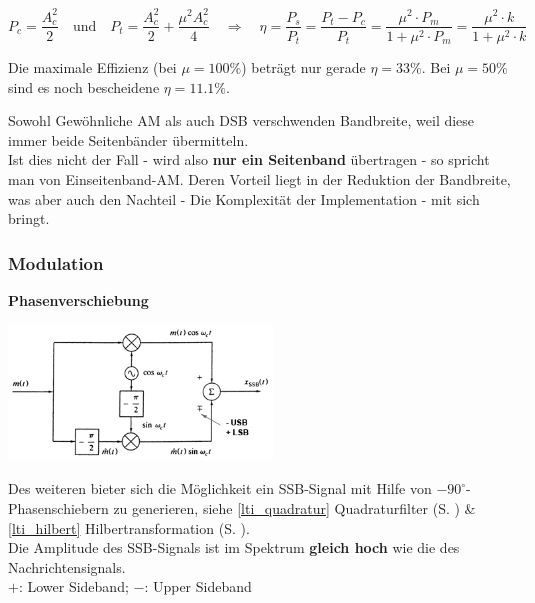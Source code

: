 $$ P_c = \frac{A_c^2}{2} \quad \text{und} \quad P_t = \frac{A_c^2}{2} + \frac{\mu^2 A_c^2}{4}
\quad \Longrightarrow \quad \eta = \frac{P_s}{P_t} = \frac{P_t - P_c}{P_t} =
\frac{\mu^2\cdot P_m}{1+\mu^2 \cdot P_m} =
\frac{\mu^2\cdot k}{1+\mu^2 \cdot k}$$

Die maximale Effizienz (bei $\mu = 100\% $) beträgt nur gerade $ \eta = 33\% $. Bei $\mu = 50\% $
sind es noch bescheidene $\eta = 11.1\% $.

Sowohl Gewöhnliche AM als auch DSB verschwenden Bandbreite, weil diese immer beide Seitenbänder
übermitteln. \\
Ist dies nicht der Fall - wird also \textbf{nur ein Seitenband} übertragen - so spricht man von
Einseitenband-AM. Deren Vorteil liegt in der Reduktion der Bandbreite, was aber auch den Nachteil
- Die Komplexität der Implementation - mit sich bringt.

\subsubsection{Modulation}
\textbf{Phasenverschiebung }  \\
\begin{minipage}[t][3.7cm][c]{7.5cm}
    \includegraphics[width=7cm]{bilder/am_ssb_modulationPhasenshifter.png}
\end{minipage}
\begin{minipage}[t][3.7cm][c]{10.5cm}	
	Des weiteren bieter sich die Möglichkeit ein SSB-Signal mit Hilfe von 
	$ - 90^{\circ} $-Phasenschiebern zu generieren, {\small siehe
	\ref{lti_quadratur} Quadraturfilter (S. \pageref{lti_quadratur}) \&
	\ref{lti_hilbert} Hilbertransformation (S. \pageref{lti_hilbert})}.\\
	Die Amplitude des SSB-Signals ist im Spektrum \textbf{gleich hoch} wie die des
	Nachrichtensignals.\\ 
	$+$: Lower Sideband; \qquad $-$: Upper Sideband
\end{minipage}

